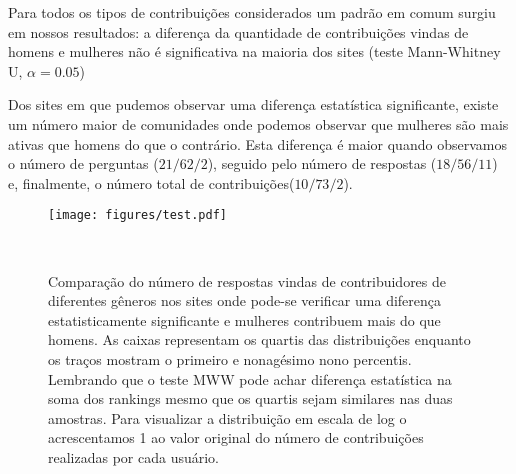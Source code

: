 Para todos os tipos de contribuições considerados um padrão em comum surgiu em nossos resultados: a diferença da quantidade de contribuições vindas de homens e mulheres não é significativa na maioria dos sites (teste Mann-Whitney U, $\alpha = 0.05$)


Dos sites em que pudemos observar uma diferença estatística significante, existe um número maior de comunidades onde podemos observar que mulheres são mais ativas que homens do que o contrário. Esta diferença é maior quando observamos o número de perguntas ($21/62/2$), seguido pelo número de respostas ($18/56/11$) e, finalmente, o número total de contribuições($10/73/2$). 

\begin{figure}
  \centering
  \texttt{[image: figures/test.pdf]}
  \caption[Comparação do número de respostas em comunidades onde mulheres respondem mais.]{Comparação do número de respostas vindas de contribuidores de diferentes gêneros nos sites onde pode-se verificar uma diferença estatisticamente significante e mulheres contribuem mais do que homens. As caixas representam os quartis das distribuições enquanto os traços mostram o primeiro e nonagésimo nono percentis. Lembrando que o teste MWW pode achar diferença estatística na soma dos rankings mesmo que os quartis sejam similares nas duas amostras. Para visualizar a distribuição em escala de log o acrescentamos 1 ao valor original do número de contribuições realizadas por cada usuário.}~\label{figure:answers}
\end{figure}


